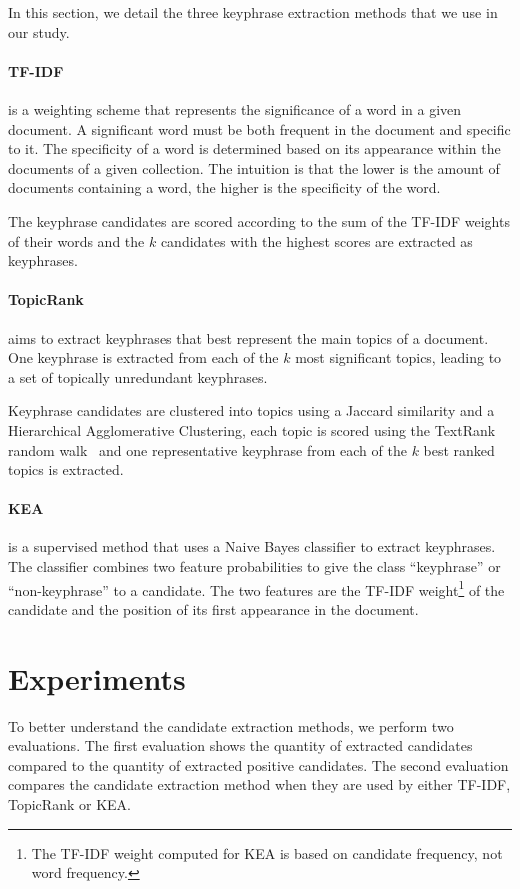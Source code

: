   In this section, we detail the three keyphrase extraction methods that we use
  in our study.

  \paragraph{TF-IDF~\textnormal{\cite{jones1972tfidf}}} is a weighting scheme
  that represents the significance of a word in a given document. A significant
  word must be both frequent in the document and specific to it. The specificity
  of a word is determined based on its appearance within the documents of a
  given collection. The intuition is that the lower is the amount of documents
  containing a word, the higher is the specificity of the word.

  The keyphrase candidates are scored according to the sum of the TF-IDF weights
  of their words and the $k$ candidates with the highest scores are extracted as
  keyphrases.

  \paragraph{TopicRank~\textnormal{\cite{bougouin2013topicrank}}} aims to
  extract keyphrases that best represent the main topics of a document. One
  keyphrase is extracted from each of the $k$ most significant topics, leading
  to a set of topically unredundant keyphrases.

  Keyphrase candidates are clustered into topics using a Jaccard similarity and
  a Hierarchical Agglomerative Clustering, each topic is scored using the
  TextRank random walk~\cite{mihalcea2004textrank} and one representative
  keyphrase from each of the $k$ best ranked topics is extracted.

  \paragraph{KEA~\textnormal{\cite{witten1999kea}}} is a supervised method that
  uses a Naive Bayes classifier to extract keyphrases. The classifier combines
  two feature probabilities to give the class ``keyphrase'' or ``non-keyphrase''
  to a candidate. The two features are the TF-IDF weight\footnote{The TF-IDF
  weight computed for KEA is based on candidate frequency, not word frequency.}
  of the candidate and the position of its first appearance in the document.

\section{Experiments}
\label{sec:evaluation}
  To better understand the candidate extraction methods, we perform two
  evaluations. The first evaluation shows the quantity of extracted candidates
  compared to the quantity of extracted positive candidates. The second
  evaluation compares the candidate extraction method when they are used by
  either TF-IDF, TopicRank or KEA.

